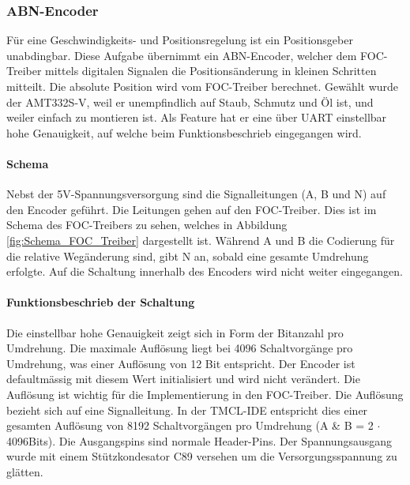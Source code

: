\subsubsection{ABN-Encoder}
\label{subsubsec:ABN-Encoder}

Für eine Geschwindigkeits- und Positionsregelung ist ein Positionsgeber unabdingbar. Diese Aufgabe übernimmt ein ABN-Encoder, welcher dem FOC-Treiber mittels digitalen Signalen die Positionsänderung in kleinen Schritten mitteilt. Die absolute Position wird vom FOC-Treiber berechnet. Gewählt wurde der AMT332S-V, weil er unempfindlich auf Staub, Schmutz und Öl ist, und weiler einfach zu montieren ist. Als Feature hat er eine über UART einstellbar hohe Genauigkeit, auf welche beim Funktionsbeschrieb eingegangen wird.

\paragraph{Schema}\mbox{}

Nebst der 5V-Spannungsversorgung sind die Signalleitungen (A, B und N) auf den Encoder geführt. Die Leitungen gehen auf den FOC-Treiber. Dies ist im Schema des FOC-Treibers zu sehen, welches in Abbildung \ref{fig:Schema_FOC_Treiber} dargestellt ist. Während A und B die Codierung für die relative Wegänderung sind, gibt N an, sobald eine gesamte Umdrehung erfolgte. Auf die Schaltung innerhalb des Encoders wird nicht weiter eingegangen.

\paragraph{Funktionsbeschrieb der Schaltung}\mbox{}

Die einstellbar hohe Genauigkeit zeigt sich in Form der Bitanzahl pro Umdrehung. Die maximale Auflösung liegt bei 4096 Schaltvorgänge pro Umdrehung, was einer Auflösung von 12 Bit entspricht. Der Encoder ist defaultmässig mit diesem Wert initialisiert und wird nicht verändert. Die Auflösung ist wichtig für die Implementierung in den FOC-Treiber. Die Auflösung bezieht sich auf eine Signalleitung. In der TMCL-IDE entspricht dies einer gesamten Auflösung von 8192 Schaltvorgängen pro Umdrehung (A \& B = 2 $\cdot$ 4096Bits). Die Ausgangspins sind normale Header-Pins. Der Spannungsausgang wurde mit einem Stützkondesator C89 versehen um die Versorgungsspannung zu glätten. \cite[S.1]{cui_devices_cui_2019}

